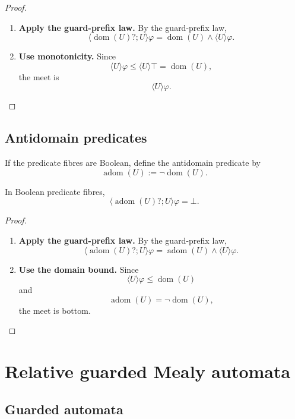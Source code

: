 \begin{proof}
\leavevmode
\begin{enumerate}
\item \textbf{Apply the guard-prefix law.}
By the guard-prefix law,
\[
\langle \operatorname{dom}(U)?;U\rangle\varphi
=
\operatorname{dom}(U)\wedge\langle U\rangle\varphi.
\]

\item \textbf{Use monotonicity.}
Since
\[
\langle U\rangle\varphi\le\langle U\rangle\top
=
\operatorname{dom}(U),
\]
the meet is
\[
\langle U\rangle\varphi.
\]
\end{enumerate}
\end{proof}

\subsection{Antidomain predicates}
\label{subsec:poly-relative-antidomain-predicate}

If the predicate fibres are Boolean, define the antidomain predicate by
\[
\operatorname{adom}(U):=\neg\operatorname{dom}(U).
\]

\begin{proposition}
\label{prop:poly-relative-antidomain-annihilation}
In Boolean predicate fibres,
\[
\langle \operatorname{adom}(U)?;U\rangle\varphi
=
\bot.
\]
\end{proposition}

\begin{proof}
\leavevmode
\begin{enumerate}
\item \textbf{Apply the guard-prefix law.}
By the guard-prefix law,
\[
\langle \operatorname{adom}(U)?;U\rangle\varphi
=
\operatorname{adom}(U)\wedge\langle U\rangle\varphi.
\]

\item \textbf{Use the domain bound.}
Since
\[
\langle U\rangle\varphi\le\operatorname{dom}(U)
\]
and
\[
\operatorname{adom}(U)=\neg\operatorname{dom}(U),
\]
the meet is bottom.
\end{enumerate}
\end{proof}

\section{Relative guarded Mealy automata}
\label{sec:poly-relative-guarded-automata}

\subsection{Guarded automata}
\label{subsec:poly-relative-guarded-automata-definition}

